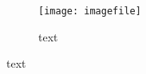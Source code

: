 
\begin{figure}[ht]
	\centering
	\begin{subfigure}[t]{0.48\columnwidth}
		\texttt{[image: imagefile]}
		\caption{text}
		\label{key}
	\end{subfigure}
\end{figure}